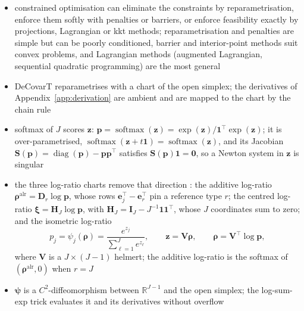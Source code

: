 \begin{itemize}
  \item constrained optimisation can eliminate the constraints by reparametrisation, enforce them
        softly with penalties or barriers, or enforce feasibility exactly by projections, Lagrangian or
        \gls{kkt} methods; reparametrisation and penalties are simple but can be poorly
        conditioned, barrier and interior-point methods suit convex problems, and Lagrangian methods
        (augmented Lagrangian, sequential quadratic programming) are the most general
  \item DeCovarT reparametrises with a \gls{chart} of the open simplex; the derivatives of
        Appendix~\ref{app:derivation} are \gls{ambient} and are mapped to the chart by the chain rule
  \item softmax of \(J\) scores \(\boldsymbol{z}\): \(\boldsymbol{p}=\operatorname{softmax}(\boldsymbol{z})=\exp(\boldsymbol{z})/\mathbf{1}^{\top}\exp(\boldsymbol{z})\);
        it is over-parametrised, \(\operatorname{softmax}(\boldsymbol{z}+t\mathbf{1})=\operatorname{softmax}(\boldsymbol{z})\), and its Jacobian
        \(\boldsymbol{S}(\boldsymbol{p})=\operatorname{diag}(\boldsymbol{p})-\boldsymbol{p}\boldsymbol{p}^{\top}\) satisfies \(\boldsymbol{S}(\boldsymbol{p})\mathbf{1}=\boldsymbol{0}\), so a
        Newton system in \(\boldsymbol{z}\) is singular
  \item the three log-ratio charts remove that direction
        \cite{aitchisonStatisticalAnalysisCompositional1982,CoordinateRepresentation2015}: the additive log-ratio
        \(\boldsymbol{\rho}^{\mathrm{alr}}=\boldsymbol{D}_{r}\log\boldsymbol{p}\), whose rows \(\boldsymbol{e}_{j}^{\top}-\boldsymbol{e}_{r}^{\top}\) pin a
        reference type \(r\); the centred log-ratio \(\boldsymbol{\xi}=\boldsymbol{H}_{J}\log\boldsymbol{p}\), with
        \(\boldsymbol{H}_{J}=\mathbf{I}_{J}-J^{-1}\mathbf{1}\mathbf{1}^{\top}\), whose \(J\) coordinates sum to zero; and the isometric
        log-ratio
        \begin{equation}
          p_{j}=\psi_{j}(\boldsymbol{\rho})=\frac{e^{z_{j}}}{\sum_{\ell=1}^{J}e^{z_{\ell}}},
          \qquad
          \boldsymbol{z}=\mathbf{V}\boldsymbol{\rho},
          \qquad
          \boldsymbol{\rho}=\mathbf{V}^{\top}\log\boldsymbol{p},
          \label{eq-mapping-function}
        \end{equation}
        where \(\mathbf{V}\) is a \(J\times(J-1)\) \gls{helmert}; the additive log-ratio is the softmax of
        \((\boldsymbol{\rho}^{\mathrm{alr}},0)\) when \(r=J\)
  \item \(\boldsymbol{\psi}\) is a \(C^{2}\)-diffeomorphism between \(\mathbb{R}^{J-1}\) and the open simplex; the
        log-sum-exp trick evaluates it and its derivatives without overflow
\end{itemize}

